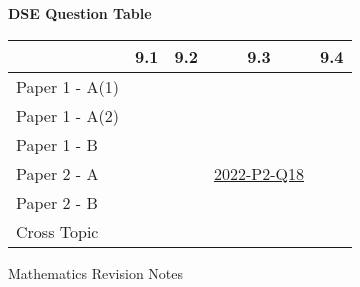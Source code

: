 \documentclass[12pt, a4paper]{article}
\begin{document}
\begin{absolutelynopagebreak}
\begin{center}
\textbf{DSE Question Table}
\end{center}
\begin{center}
\begin{tabular}{|l|c|c|c|c|}
\hline
        & 9.1 & 9.2 & 9.3 & 9.4 \\\hline
\hline
Paper 1 - A(1)&  &  &  &  \\
\hline
Paper 1 - A(2)&  &  &  &  \\
\hline
Paper 1 - B&  &  &  &  \\
\hline
\hline
Paper 2 - A&  &  & \hyperref[DSE2022-CoreP2-Q18]{2022-P2-Q18} &  \\
\hline
Paper 2 - B&  &  &  &  \\
\hline
\hline
Cross Topic&  &  &  &  \\
\hline
\end{tabular}
\end{center}
\end{absolutelynopagebreak}
\newpage
\newpage
\thispagestyle{empty}
\begin{center}
Mathematics Revision Notes\\\vspace{1cm}
\\\vspace{1cm}
{\fontsize{24pt}{24pt}\selectfont {Introduction to Coordinates}} \\\vspace{1cm}
\label{chapter:S1-10}

\end{center}
\vspace{0.5cm}
\hline
\end{document}
